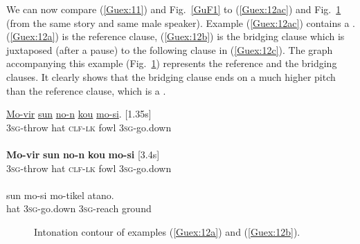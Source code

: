 \documentclass[output=paper]{LSP/langsci}
\begin{document}
We can now compare (\ref{Guex:11}) and Fig.~\ref{GuF1} to (\ref{Guex:12ac}) and Fig.~\ref{GuF2} (from the same story and same male speaker). Example (\ref{Guex:12ac}) contains a . (\ref{Guex:12a}) is the reference clause, (\ref{Guex:12b}) is the bridging clause which is juxtaposed (after a pause) to the following clause in (\ref{Guex:12c}). The graph accompanying this example (Fig.~\ref{GuF2}) represents the reference and the bridging clauses. It clearly shows that the bridging clause ends on a much higher pitch than the reference clause, which is a .


\begin{exe}
\ex \label{Guex:12ac}
\begin{xlist}
\ex \label{Guex:12a}
\gll \underline{Mo-vir}        \underline{sun}   \underline{no-n}          \underline{kou}   \underline{mo-si}. [1.35s]\\
\textsc{3sg}-throw   hat   \textsc{clf-lk}   fowl   \textsc{3sg}-go.down \\
\glt {}\\
\ex \label{Guex:12b}
\gll \textbf{Mo-vir}      \textbf{sun}    \textbf{no-n}           \textbf{kou}    \textbf{mo-si} [3.4s] \\
\textsc{3sg}-throw   hat   \textsc{clf-lk}   fowl   \textsc{3sg}-go.down\\
\glt {}\\
\ex \label{Guex:12c}
\gll sun    mo-si          mo-tikel        atano.\\     	       
hat    \textsc{3sg}-go.down   \textsc{3sg}-reach     ground\\
\glt {} 
\end{xlist}
\end{exe}

\begin{figure}[ht]
\caption{Intonation contour of examples (\ref{Guex:12a}) and (\ref{Guex:12b}). \label{GuF2}}
\end{figure}
\end{document}
